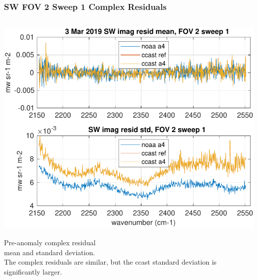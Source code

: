 \documentclass[10pt]{beamer}
\begin{document}
\begin{frame}
\frametitle{SW FOV 2 Sweep 1 Complex Residuals}
\begin{columns}[t]
\begin{column}{0.5\textwidth}
  \begin{centering}
  \includegraphics[width=\textwidth]{figures/SW_MW_good_imag_fov2_sd1.pdf}
  \end{centering}\vspace{3mm}
  Pre-anomaly complex residual \\mean and standard deviation.  \\The
  complex residuals are similar, but the ccast standard deviation is
  significantly larger.


\end{column}
\end{columns}
\end{frame}
\end{document}
